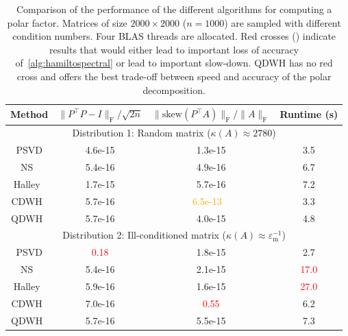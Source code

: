 \documentclass[final,onefignum,onetabnum,dvipsnames]{siamart251216}
\numberwithin{algorithm}{section}
\numberwithin{equation}{section}
\newcommand{\xmark}{\textcolor{Red}{\ding{55}}}%
\newcommand{\nmark}{{\textcolor{Orange}{\ \ding{169}}}}
\newcommand{\red}[1]{\textcolor{Red}{#1}}
\newcommand{\orange}[1]{\textcolor{Orange}{#1}}
\begin{document}
\begin{table}[ht]
    \centering
    \begin{tabular}{||c|c|c|c||}
    \hline
         Method & $\|P^\top P - I\|_\mathrm{F} / \sqrt{2n}$& $\|\mathrm{skew}(P^\top A)\|_\mathrm{F}/\|A\|_\mathrm{F}$&Runtime (s) \\
         
         \hline
         \multicolumn{4}{||c||}{Distribution 1: Random matrix ($\kappa(A) \approx 2780$)}\\
         \hline         
PSVD & 4.6e-15 & 1.3e-15 & 3.5\\ 
NS~\cite{BjorckBowie1971} & 5.4e-16 & 4.9e-16 & 6.7\\
Halley~\cite{Gander1990Polar}  & 1.7e-15& 5.7e-16 & 7.2\\
CDWH~\cite{NakatsukasaBaiGygi2010} & 5.7e-16 & \orange{6.5e-13} \nmark & 3.3\\
QDWH~\cite{NakatsukasaBaiGygi2010} & 5.7e-16 & 4.0e-15 & 4.8\\

\hline
        
         \multicolumn{4}{||c||}{Distribution 2: Ill-conditioned matrix ($\kappa(A) \approx \varepsilon_\mathrm{m}^{-1}$)}\\
         \hline
PSVD & \red{0.18} \xmark  & 1.8e-15 & 2.7\\
NS~\cite{BjorckBowie1971} & 5.4e-16  & 2.1e-15 & \red{17.0} \xmark\\
Halley~\cite{Gander1990Polar}  & 5.9e-16  & 1.6e-15 &\red{ 27.0} \xmark\\
CDWH~\cite{NakatsukasaBaiGygi2010} & 7.0e-16  & \red{0.55} \xmark & 6.2\\
 QDWH~\cite{NakatsukasaBaiGygi2010}&5.7e-16 & 5.5e-15 & 7.3\\

\hline
    \end{tabular}
    \caption{Comparison of the performance of the different algorithms for computing a polar factor. Matrices of size $2000\times 2000$ ($n=1000$) are sampled with different condition numbers. Four BLAS threads are allocated. Red crosses (\xmark) indicate results that would either lead to important loss of accuracy of~\cref{alg:hamiltospectral} or lead to important slow-down. QDWH has no red cross and offers the best trade-off between speed and accuracy of the polar decomposition.}
    \label{tab:polar_performance}
\end{table}
\end{document}
